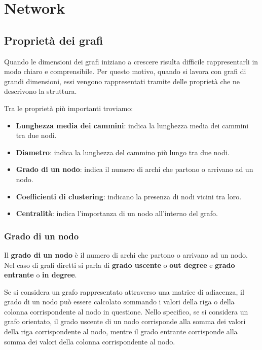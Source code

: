 \chapter{Network}
\section{Proprietà dei grafi}
Quando le dimensioni dei grafi iniziano a crescere risulta difficile
rappresentarli in modo chiaro e comprensibile. Per questo motivo, quando si
lavora con grafi di grandi dimensioni, essi vengono rappresentati tramite
delle proprietà che ne descrivono la struttura.

Tra le proprietà più importanti troviamo:
\begin{itemize}
    \item \textbf{Lunghezza media dei cammini}: indica la lunghezza media dei
          cammini tra due nodi.
    \item \textbf{Diametro}: indica la lunghezza del cammino più lungo tra due
          nodi.
    \item \textbf{Grado di un nodo}: indica il numero di archi che partono o
          arrivano ad un nodo.
    \item \textbf{Coefficienti di clustering}: indicano la presenza di nodi
          vicini tra loro.
    \item \textbf{Centralità}: indica l'importanza di un nodo all'interno del
          grafo.
\end{itemize}
\subsection{Grado di un nodo}
\begin{definizione}
    Il \textbf{grado di un nodo} è il numero di archi che partono o arrivano ad
    un nodo. Nel caso di grafi diretti si parla di \textbf{grado uscente} o
    \textbf{out degree} e \textbf{grado entrante} o \textbf{in degree}.
\end{definizione}

Se si considera un grafo rappresentato attraverso una matrice di adiacenza, il
grado di un nodo può essere calcolato sommando i valori della riga o della
colonna corrispondente al nodo in questione. Nello specifico, se si considera
un grafo orientato, il grado uscente di un nodo corrisponde alla somma dei
valori della riga corrispondente al nodo, mentre il grado entrante corrisponde
alla somma dei valori della colonna corrispondente al nodo.


